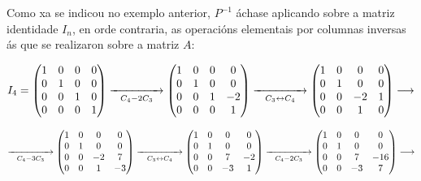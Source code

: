 \documentclass[twoside]{report}
\theoremstyle{mystyle}
\begin{document}
\vspace{3mm}

\noindent Como xa se indicou no exemplo anterior, $P^{-1}$ áchase aplicando sobre a matriz identidade $I_{n}$, en orde contraria, as operacións elementais por columnas inversas ás que se realizaron sobre a matriz $A$:

$$
I_{4} = 
\begin{pmatrix}
1 & 0 & 0 & 0\\
0 & 1 & 0 & 0\\
0 & 0 & 1 & 0\\
0 & 0 & 0 & 1
\end{pmatrix}
\underset{C_{4} - 2C_{3}}{\xrightarrow{\hspace{15mm}}}
\begin{pmatrix}
1 & 0 & 0 & 0\\
0 & 1 & 0 & 0\\
0 & 0 & 1 & -2\\
0 & 0 & 0 & 1
\end{pmatrix}
\underset{C_{3} \leftrightarrow C_{4}}{\xrightarrow{\hspace{15mm}}}
\begin{pmatrix}
1 & 0 & 0 & 0\\
0 & 1 & 0 & 0\\
0 & 0 & -2 & 1\\
0 & 0 & 1 & 0
\end{pmatrix}
\longrightarrow
$$

$$
\underset{C_{4} - 3C_{3}}{\xrightarrow{\hspace{15mm}}}
\begin{pmatrix}
1 & 0 & 0 & 0\\
0 & 1 & 0 & 0\\
0 & 0 & -2 & 7\\
0 & 0 & 1 & -3
\end{pmatrix}
\underset{C_{3} \leftrightarrow C_{4}}{\xrightarrow{\hspace{15mm}}}
\begin{pmatrix}
1 & 0 & 0 & 0\\
0 & 1 & 0 & 0\\
0 & 0 & 7 & -2\\
0 & 0 & -3 & 1
\end{pmatrix}
\underset{C_{4} - 2C_{3}}{\xrightarrow{\hspace{15mm}}}
\begin{pmatrix}
1 & 0 & 0 & 0\\
0 & 1 & 0 & 0\\
0 & 0 & 7 & -16\\
0 & 0 & -3 & 7
\end{pmatrix}
\longrightarrow
$$
\end{document}

